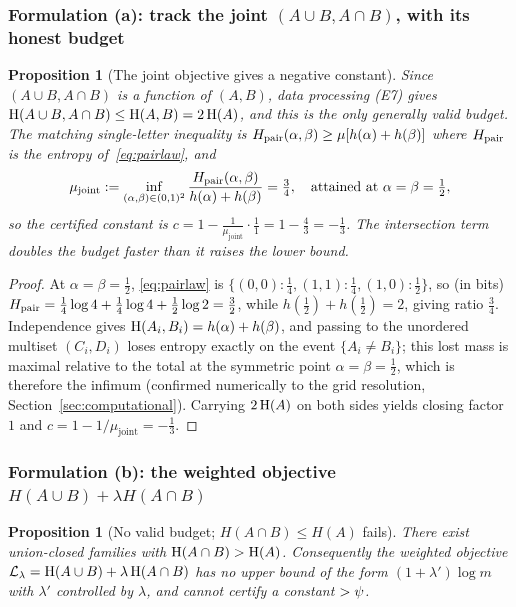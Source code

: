 \documentclass[11pt]{amsart}
\newtheorem{proposition}[theorem]{Proposition}
\theoremstyle{definition}
\theoremstyle{remark}
\begin{document}
\subsubsection*{Formulation (a): track the joint $(A\cup B,A\cap B)$, with its honest budget}

\begin{proposition}[The joint objective gives a negative constant]\label{prop:joint}
Since $(A\cup B,A\cap B)$ is a function of $(A,B)$, data processing (E7) gives
$\operatorname{H}(A\cup B,A\cap B)\le\operatorname{H}(A,B)=2\operatorname{H}(A)$, and this is the only generally valid
budget. The matching single-letter inequality is
$H_{\mathrm{pair}}(\alpha,\beta)\ge\mu[h(\alpha)+h(\beta)]$ where $H_{\mathrm{pair}}$ is the entropy
of~\eqref{eq:pairlaw}, and
\[
   \mu_{\mathrm{joint}}:=\inf_{(\alpha,\beta)\in(0,1)^2}
   \frac{H_{\mathrm{pair}}(\alpha,\beta)}{h(\alpha)+h(\beta)}=\tfrac34,
   \quad\text{attained at }\alpha=\beta=\tfrac12,
\]
so the certified constant is $c=1-\tfrac1{\mu_{\mathrm{joint}}}\cdot\tfrac{1}{1}
=1-\tfrac{4}{3}=-\tfrac13$. The intersection term doubles the budget faster than
it raises the lower bound.
\end{proposition}

\begin{proof}
At $\alpha=\beta=\tfrac12$, \eqref{eq:pairlaw} is
$\{(0,0):\tfrac14,(1,1):\tfrac14,(1,0):\tfrac12\}$, so (in bits)
$H_{\mathrm{pair}}=\tfrac14\log 4+\tfrac14\log 4+\tfrac12\log 2=\tfrac32$, while
$h(\tfrac12)+h(\tfrac12)=2$, giving ratio $\tfrac34$. Independence gives
$\operatorname{H}(A_i,B_i)=h(\alpha)+h(\beta)$, and passing to the unordered multiset
$(C_i,D_i)$ loses entropy exactly on the event $\{A_i\neq B_i\}$; this lost mass
is maximal relative to the total at the symmetric point $\alpha=\beta=\tfrac12$,
which is therefore the infimum (confirmed numerically to the grid resolution,
Section~\ref{sec:computational}). Carrying $2\operatorname{H}(A)$ on both sides yields closing
factor $1$ and $c=1-1/\mu_{\mathrm{joint}}=-\tfrac13$.
\end{proof}

\subsubsection*{Formulation (b): the weighted objective $H(A\cup B)+\lambda H(A\cap B)$}

\begin{proposition}[No valid budget; $H(A\cap B)\le H(A)$ fails]\label{prop:inter}
There exist union-closed families with $\operatorname{H}(A\cap B)>\operatorname{H}(A)$. Consequently the
weighted objective $\mathcal L_\lambda=\operatorname{H}(A\cup B)+\lambda\operatorname{H}(A\cap B)$ has no
upper bound of the form $(1+\lambda')\log m$ with $\lambda'$ controlled by
$\lambda$, and cannot certify a constant $>\psi$.
\end{proposition}
\end{document}
